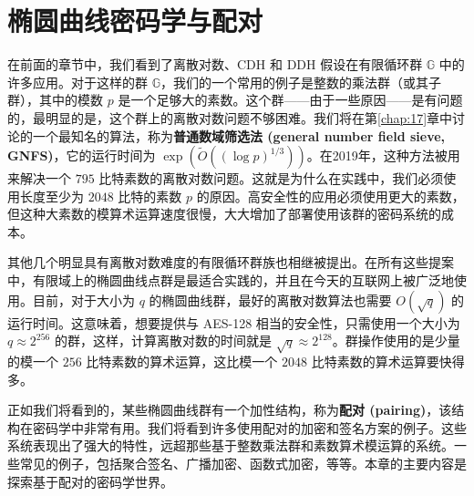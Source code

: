 \chapter{椭圆曲线密码学与配对}\label{chap:15}

在前面的章节中，我们看到了离散对数、CDH 和 DDH 假设在有限循环群 $\mathbb{G}$ 中的许多应用。对于这样的群 $\mathbb{G}$，我们的一个常用的例子是整数的乘法群（或其子群），其中的模数 $p$ 是一个足够大的素数。这个群——由于一些原因——是有问题的，最明显的是，这个群上的离散对数问题不够困难。我们将在第\ref{chap:17}章中讨论的一个最知名的算法，称为\textbf{普通数域筛选法 (general number field sieve, GNFS)}，它的运行时间为 $\exp(\tilde O((\log p)^{1/3}))$。在2019年，这种方法被用来解决一个 $795$ 比特素数的离散对数问题。这就是为什么在实践中，我们必须使用长度至少为 $2048$ 比特的素数 $p$ 的原因。高安全性的应用必须使用更大的素数，但这种大素数的模算术运算速度很慢，大大增加了部署使用该群的密码系统的成本。

其他几个明显具有离散对数难度的有限循环群族也相继被提出。在所有这些提案中，有限域上的椭圆曲线点群是最适合实践的，并且在今天的互联网上被广泛地使用。目前，对于大小为 $q$ 的椭圆曲线群，最好的离散对数算法也需要 $O(\sqrt{q})$ 的运行时间。这意味着，想要提供与 AES-128 相当的安全性，只需使用一个大小为 $q\approx 2^{256}$ 的群，这样，计算离散对数的时间就是 $\sqrt{q}\approx2^{128}$。群操作使用的是少量的模一个 $256$ 比特素数的算术运算，这比模一个 $2048$ 比特素数的算术运算要快得多。

\begin{snote}[加性结构。]
正如我们将看到的，某些椭圆曲线群有一个加性结构，称为\textbf{配对 (pairing)}，该结构在密码学中非常有用。我们将看到许多使用配对的加密和签名方案的例子。这些系统表现出了强大的特性，远超那些基于整数乘法群和素数算术模运算的系统。一些常见的例子，包括聚合签名、广播加密、函数式加密，等等。本章的主要内容是探索基于配对的密码学世界。
\end{snote}











